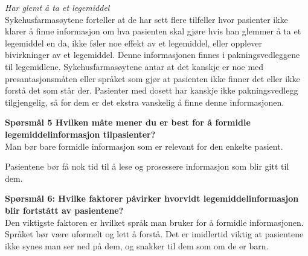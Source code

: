 \textit{Har glemt å ta et legemiddel} \\
Sykehusfarmasøytene forteller at de har sett flere tilfeller hvor pasienter ikke klarer å finne informasjon om hva pasienten skal gjøre hvis han glemmer å ta et legemiddel en da, ikke føler noe effekt av et legemiddel, eller opplever bivirkninger av et legemiddel. Denne informasjonen finnes i pakningsvedleggene til legemidlene. Sykehusfarmasøytene antar at det kanskje er noe med presantasjonsmåten eller språket som gjør at pasienten ikke finner det eller ikke forstå det som står der. Pasienter med dosett har kanskje ikke pakningsvedlegg tilgjengelig, så for dem er det ekstra vanskelig å finne denne informasjonen.

\textbf{Spørsmål 5 Hvilken måte mener du er best for å formidle legemiddelinformasjon tilpasienter?} \\
Man bør bare formidle informasjon som er relevant for den enkelte pasient. 

Pasientene bør få nok tid til å lese og prosessere informasjon som blir gitt til dem. 

\textbf{Spørsmål 6: Hvilke faktorer påvirker hvorvidt legemiddelinformasjon blir fortstått av pasientene?} \\
Den viktigste faktoren er hvilket språk man bruker for å formidle informasjonen. Språket bør være uformelt og lett å forstå. Det er imidlertid viktig at pasientene ikke synes man ser ned på dem, og snakker til dem som om de er barn. 


